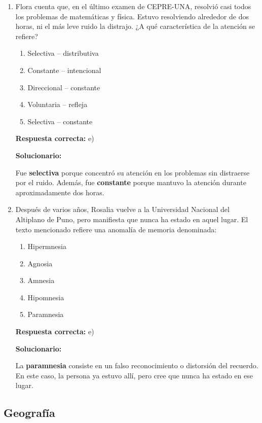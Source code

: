 \begin{enumerate}[resume]
	\item Flora cuenta que, en el último examen de CEPRE-UNA, resolvió casi todos los problemas de matemáticas y física. Estuvo resolviendo alrededor de dos horas, ni el más leve ruido la distrajo. ¿A qué característica de la atención se refiere?
	\begin{enumerate}[label=\alph*)]
		\item Selectiva -- distributiva
		\item Constante -- intencional
		\item Direccional -- constante
		\item Voluntaria -- refleja
		\item Selectiva -- constante
	\end{enumerate}
	\textbf{Respuesta correcta:} e)
	
	\vspace{2mm}
	\textbf{Solucionario:}
	
	Fue \textbf{selectiva} porque concentró su atención en los problemas sin distraerse por el ruido.  
	Además, fue \textbf{constante} porque mantuvo la atención durante aproximadamente dos horas.
	
	\vspace{6mm}
	
	\item Después de varios años, Rosalia vuelve a la Universidad Nacional del Altiplano de Puno, pero manifiesta que nunca ha estado en aquel lugar. El texto mencionado refiere una anomalía de memoria denominada:
	\begin{enumerate}[label=\alph*)]
		\item Hipermnesia
		\item Agnosia
		\item Amnesia
		\item Hipomnesia
		\item Paramnesia
	\end{enumerate}
	\textbf{Respuesta correcta:} e)
	
	\vspace{2mm}
	\textbf{Solucionario:}
	
	La \textbf{paramnesia} consiste en un falso reconocimiento o distorsión del recuerdo.  
	En este caso, la persona ya estuvo allí, pero cree que nunca ha estado en ese lugar.
	
	\vspace{6mm}
	
\end{enumerate}

\subsection*{Geografía}

